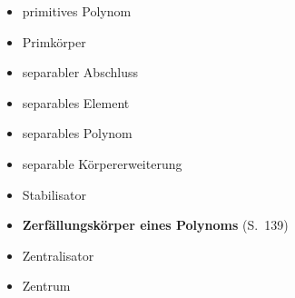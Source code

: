 \begin{itemize}
  \item
    primitives Polynom
  \item
    Primkörper
  \item
    separabler Abschluss
  \item
    separables Element
  \item
    separables Polynom
  \item
    separable Körpererweiterung
  \item
    Stabilisator
  \item
    \textbf{Zerfällungskörper eines Polynoms} (S.~139)
  \item
    Zentralisator
  \item
    Zentrum
\end{itemize}
